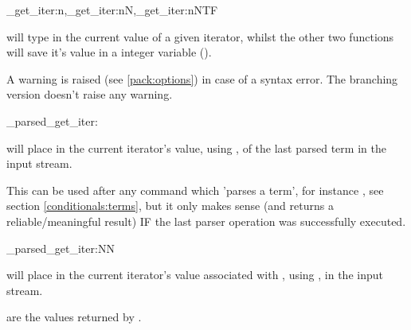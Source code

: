 \documentclass[10pt]{article}
\begin{document}
\begin{codedescribe}{\starray_get_iter:n,\starray_get_iter:nN,\starray_get_iter:nNTF}
\begin{codesyntax}%
\end{codesyntax}
 will type in the current value of a given iterator, whilst the other two functions will save it's value in a integer variable ().
\end{codedescribe}
\begin{tsremark}
A warning is raised (see \ref{pack:options}) in case of a  syntax error. The branching version doesn't raise any warning.
\end{tsremark}

\begin{codedescribe}[code,EXP,new=2023/05/20]{\starray_parsed_get_iter:}
\begin{codesyntax}%
\end{codesyntax}
 will place in the current iterator's value,  using , of the last parsed term in the input stream.
\end{codedescribe}
\begin{tsremark}
This can be used after any command which 'parses a term', for instance , see section \ref{conditionals:terms}, but it only makes sense (and returns a reliable/meaningful result) IF the last parser operation was successfully executed.
\end{tsremark}

\begin{codedescribe}[code,EXP,new=2023/11/28]{\starray_parsed_get_iter:NN}
\begin{codesyntax}%
\end{codesyntax}
 will place in the current iterator's value associated with ,  using , in the input stream.
\end{codedescribe}
\begin{tsremark}
 are the values returned by .
\end{tsremark}
\end{document}
